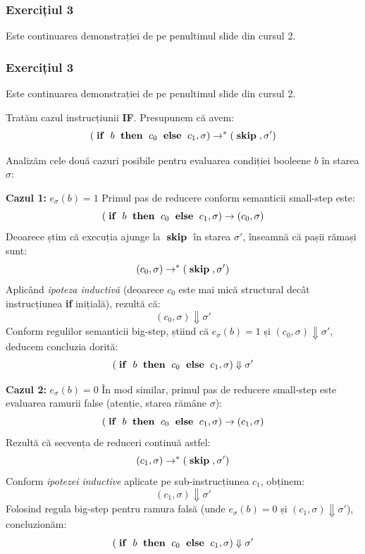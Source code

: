 \subsubsection{Exercițiul 3}

Este continuarea demonstrației de pe penultimul slide din cursul 2.

\subsubsection{Exercițiul 3}

Este continuarea demonstrației de pe penultimul slide din cursul 2.

Tratăm cazul instrucțiunii \textbf{IF}. Presupunem că avem:
\[
	(\instr{if}\ b\ \instr{then}\ c_0\ \instr{else}\ c_{1}, \sigma) \to^* (\instr{skip}, \sigma')
\]

Analizăm cele două cazuri posibile pentru evaluarea condiției booleene $b$ în starea $\sigma$:

\textbf{Cazul 1:} $e_{\sigma}(b) = 1$
Primul pas de reducere conform semanticii small-step este:
\[
	(\instr{if}\ b\ \instr{then}\ c_0\ \instr{else}\ c_{1}, \sigma) \to (c_0, \sigma)
\]
Deoarece știm că execuția ajunge la $\;\mathrm{\mathbf{skip}}\;$ în starea $\sigma'$, înseamnă că pașii rămași sunt:
\[
	(c_0, \sigma) \to^* (\;\mathrm{\mathbf{skip}}\;, \sigma')
\]
Aplicând \textit{ipoteza inductivă} (deoarece $c_0$ este mai mică structural decât instrucțiunea \textbf{if} inițială), rezultă că:
\[
	(c_0, \sigma) \Downarrow \sigma'
\]
Conform regulilor semanticii big-step, știind că $e_{\sigma}(b) = 1$ și $(c_0, \sigma) \Downarrow \sigma'$, deducem concluzia dorită:
\[
	(\instr{if}\ b\ \instr{then}\ c_0\ \instr{else}\ c_{1}, \sigma) \Downarrow \sigma'
\]

\textbf{Cazul 2:} $e_{\sigma}(b) = 0$
În mod similar, primul pas de reducere small-step este evaluarea ramurii false (atenție, starea rămâne $\sigma$):
\[
	(\instr{if}\ b\ \instr{then}\ c_0\ \instr{else}\ c_{1}, \sigma) \to (c_1, \sigma)
\]
Rezultă că secvența de reduceri continuă astfel:
\[
	(c_1, \sigma) \to^* (\;\mathrm{\mathbf{skip}}\;, \sigma')
\]
Conform \textit{ipotezei inductive} aplicate pe sub-instrucțiunea $c_1$, obținem:
\[
	(c_1, \sigma) \Downarrow \sigma'
\]
Folosind regula big-step pentru ramura falsă (unde $e_{\sigma}(b) = 0$ și $(c_1, \sigma) \Downarrow \sigma'$), concluzionăm:
\[
	(\instr{if}\ b\ \instr{then}\ c_0\ \instr{else}\ c_{1}, \sigma) \Downarrow \sigma'
\]

